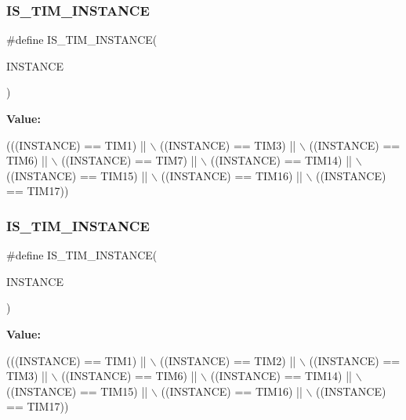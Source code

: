 \subsubsection{\texorpdfstring{I\+S\+\_\+\+T\+I\+M\+\_\+\+I\+N\+S\+T\+A\+N\+CE}{IS\_TIM\_INSTANCE}\hspace{0.1cm}{\footnotesize\ttfamily [7/16]}}
{\footnotesize\ttfamily \#define I\+S\+\_\+\+T\+I\+M\+\_\+\+I\+N\+S\+T\+A\+N\+CE(\begin{DoxyParamCaption}\item[{}]{I\+N\+S\+T\+A\+N\+CE }\end{DoxyParamCaption})}

{\bfseries Value\+:}
\begin{DoxyCode}
(((INSTANCE) == TIM1)    || \(\backslash\)
   ((INSTANCE) == TIM3)    || \(\backslash\)
   ((INSTANCE) == TIM6)    || \(\backslash\)
   ((INSTANCE) == TIM7)    || \(\backslash\)
   ((INSTANCE) == TIM14)   || \(\backslash\)
   ((INSTANCE) == TIM15)   || \(\backslash\)
   ((INSTANCE) == TIM16)   || \(\backslash\)
   ((INSTANCE) == TIM17))
\end{DoxyCode}
\mbox{\label{group___exported__macro_gaba506eb03409b21388d7c5a6401a4f98}} 
\subsubsection{\texorpdfstring{I\+S\+\_\+\+T\+I\+M\+\_\+\+I\+N\+S\+T\+A\+N\+CE}{IS\_TIM\_INSTANCE}\hspace{0.1cm}{\footnotesize\ttfamily [8/16]}}
{\footnotesize\ttfamily \#define I\+S\+\_\+\+T\+I\+M\+\_\+\+I\+N\+S\+T\+A\+N\+CE(\begin{DoxyParamCaption}\item[{}]{I\+N\+S\+T\+A\+N\+CE }\end{DoxyParamCaption})}

{\bfseries Value\+:}
\begin{DoxyCode}
(((INSTANCE) == TIM1)    || \(\backslash\)
   ((INSTANCE) == TIM2)    || \(\backslash\)
   ((INSTANCE) == TIM3)    || \(\backslash\)
   ((INSTANCE) == TIM6)    || \(\backslash\)
   ((INSTANCE) == TIM14)   || \(\backslash\)
   ((INSTANCE) == TIM15)   || \(\backslash\)
   ((INSTANCE) == TIM16)   || \(\backslash\)
   ((INSTANCE) == TIM17))
\end{DoxyCode}
\mbox{\label{group___exported__macro_gaba506eb03409b21388d7c5a6401a4f98}} 
